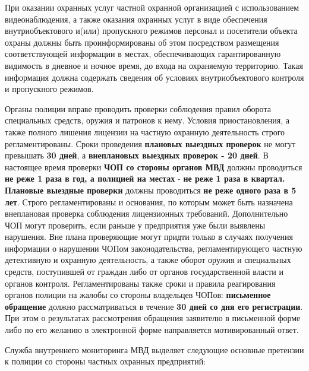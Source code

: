 \documentclass[a4paper,12pt,fleqn]{article} %
\begin{document}
При оказании охранных услуг частной охранной организацией с использованием видеонаблюдения, а также оказания охранных услуг в виде обеспечения внутриобъектового и(или) пропускного режимов персонал и посетители объекта охраны должны быть проинформированы об этом посредством размещения соответствующей информации в местах, обеспечивающих гарантированную видимость в дневное и ночное время, до входа на охраняемую территорию. Такая информация должна содержать сведения об условиях внутриобъектового контроля и пропускного режимов.

Органы полиции вправе проводить проверки соблюдения правил оборота специальных средств, оружия и патронов к нему. Условия приостановления, а также  полного лишения лицензии на частную охранную деятельность строго регламентированы. Сроки проведения \textbf{плановых выездных проверок} не могут превышать \textbf{30 дней}, а \textbf{внеплановых выездных проверок - 20 дней}. В настоящее время проверки \textbf{ЧОП со стороны органов МВД} должны проводиться \textbf{не реже 1 раза в год, а полицией на местах} - \textbf{не реже 1 раза в квартал. Плановые выездные проверки} должны проводиться \textbf{не реже одного раза в 5 лет}. Строго регламентированы и основания, по которым может быть назначена внеплановая проверка соблюдения лицензионных требований. Дополнительно ЧОП могут проверить, если раньше у предприятия уже были выявлены нарушения. Вне плана проверяющие могут придти только в случаях получения информации о нарушении ЧОПом законодательства, регламентирующего частную детективную и охранную деятельность, а также оборот оружия и специальных средств, поступившей от граждан либо от органов государственной власти и органов контроля. Регламентированы также сроки и правила реагирования органов полиции на жалобы со стороны владельцев ЧОПов: \textbf{письменное обращение} должно рассматриваться в течение \textbf{30 дней со дня его регистрации}. При этом о результатах рассмотрения обращения заявителю в письменной форме либо по его желанию в электронной форме направляется мотивированный ответ.

Служба внутреннего мониторинга МВД выделяет следующие основные претензии к полиции со стороны частных охранных предприятий:
\end{document}
